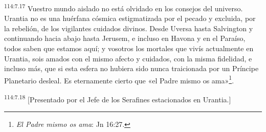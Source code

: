 \par
\textsuperscript{114:7.17} Vuestro mundo aislado no está olvidado en los consejos del universo. Urantia no es una huérfana cósmica estigmatizada por el pecado y excluida, por la rebelión, de los vigilantes cuidados divinos. Desde Uversa hasta Salvington y continuando hacia abajo hasta Jerusem, e incluso en Havona y en el Paraíso, todos saben que estamos aquí; y vosotros los mortales que vivís actualmente en Urantia, sois amados con el mismo afecto y cuidados, con la misma fidelidad, e incluso más, que si esta esfera no hubiera sido nunca traicionada por un Príncipe Planetario desleal. Es eternamente cierto que «el Padre mismo os ama»\footnote{\textit{El Padre mismo os ama}: Jn 16:27.}.

\par
\textsuperscript{114:7.18} [Presentado por el Jefe de los Serafines estacionados en Urantia.]